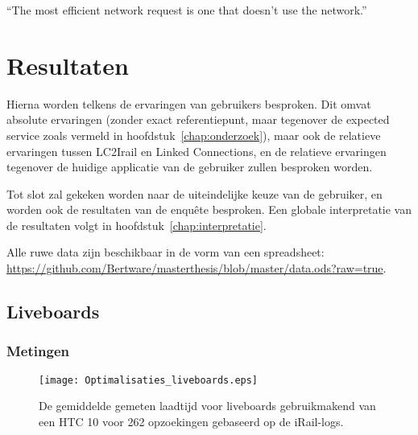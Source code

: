 \begin{savequote}[0.55\linewidth]
	``The most efficient network request is one that doesn't use the network.''
\end{savequote}

\chapter{Resultaten}
\label{chap:resultaten}

Hierna worden telkens de ervaringen van gebruikers besproken. Dit omvat absolute ervaringen (zonder exact referentiepunt, maar tegenover de expected service zoals vermeld in hoofdstuk~\ref{chap:onderzoek}), maar ook de relatieve ervaringen tussen LC2Irail en Linked Connections, en de relatieve ervaringen tegenover de huidige applicatie van de gebruiker zullen besproken worden.

Tot slot zal gekeken worden naar de uiteindelijke keuze van de gebruiker, en worden ook de resultaten van de enquête besproken. Een globale interpretatie van de resultaten volgt in hoofdstuk~\ref{chap:interpretatie}.

Alle ruwe data zijn beschikbaar in de vorm van een spreadsheet: \url{https://github.com/Bertware/masterthesis/blob/master/data.ods?raw=true}.

\section{Liveboards}
\subsection{Metingen}
\begin{figure}[h]
	\centering
	\texttt{[image: Optimalisaties\_liveboards.eps]}
		\caption[Gemeten laadtijd liveboards bij verschillende implementatiedetails]{De gemiddelde gemeten laadtijd voor liveboards gebruikmakend van een HTC 10 voor 262 opzoekingen gebaseerd op de iRail-logs. }
	\label{fig:liveboardlabtest}
\end{figure}
%		

